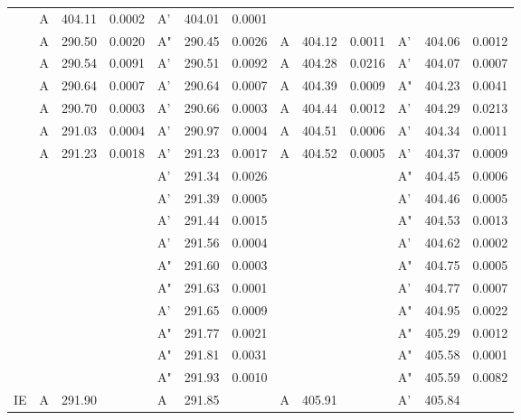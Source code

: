 \documentclass[journal=jctcce,manuscript=article]{achemso}
\begin{document}
\begin{table}
\begin{tabular}{l|lcc|lcc||lcc|lcc}
& A & 404.11 & 0.0002	& A' & 404.01 & 0.0001 \\
& A & 290.50 & 0.0020	& A" & 290.45 & 0.0026  
& A & 404.12 & 0.0011	& A' & 404.06 & 0.0012 \\
& A & 290.54 & 0.0091	& A' & 290.51 & 0.0092  
& A & 404.28 & 0.0216	& A' & 404.07 & 0.0007 \\
& A & 290.64 & 0.0007	& A' & 290.64 & 0.0007  
& A & 404.39 & 0.0009	& A" & 404.23 & 0.0041 \\
& A & 290.70 & 0.0003	& A' & 290.66 & 0.0003  
& A & 404.44 & 0.0012	& A' & 404.29 & 0.0213 \\
& A & 291.03 & 0.0004	& A' & 290.97 & 0.0004 
& A & 404.51 & 0.0006	& A' & 404.34 & 0.0011 \\
& A & 291.23 & 0.0018	& A' & 291.23 & 0.0017  
& A & 404.52 & 0.0005	& A' & 404.37 & 0.0009 \\
&&&                     & A' & 291.34 & 0.0026 
&&&                     & A" & 404.45 & 0.0006 \\
&&&                     & A' & 291.39 & 0.0005 
&&&                     & A' & 404.46 & 0.0005 \\
&&&                     & A' & 291.44 & 0.0015 
&&&                     & A" & 404.53 & 0.0013 \\
&&&                     & A' & 291.56 & 0.0004  
&&&                     & A' & 404.62 & 0.0002 \\
&&&                     & A" & 291.60 & 0.0003 
&&&                     & A" & 404.75 & 0.0005 \\
&&&                     & A" & 291.63 & 0.0001  
&&&                     & A' & 404.77 & 0.0007 \\
&&&                     & A' & 291.65 & 0.0009  
&&&                     & A" & 404.95 & 0.0022 \\
&&&                     & A" & 291.77 & 0.0021  
&&&                     & A" & 405.29 & 0.0012 \\
&&&                     & A" & 291.81 & 0.0031  
&&&                     & A" & 405.58 & 0.0001 \\
&&&                     & A" & 291.93 & 0.0010  
&&&                     & A" & 405.59 & 0.0082 \\
\hline
IE & A & 291.90 & 
   & A & 291.85 & 
   & A & 405.91 & 
   & A' & 405.84  \\
\hline
  \end{tabular}
\end{table}
\end{document}
